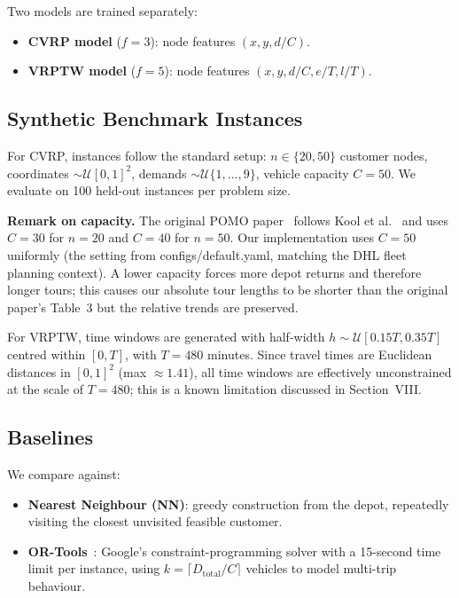 \documentclass[conference]{IEEEtran}
\begin{document}
Two models are trained separately:
\begin{itemize}
  \item \textbf{CVRP model} ($f=3$): node features $(x, y, d/C)$.
  \item \textbf{VRPTW model} ($f=5$): node features $(x, y, d/C, e/T, l/T)$.
\end{itemize}

\subsection{Synthetic Benchmark Instances}

For CVRP, instances follow the standard setup: $n \in \{20, 50\}$ customer
nodes, coordinates $\sim \mathcal{U}[0,1]^2$, demands $\sim
\mathcal{U}\{1,\ldots,9\}$, vehicle capacity $C=50$. We evaluate on 100
held-out instances per problem size.

\textbf{Remark on capacity.}
The original POMO paper~\cite{kwon2020pomo} follows Kool
et al.~\cite{kool2019attention} and uses $C=30$ for $n=20$ and $C=40$ for
$n=50$. Our implementation uses $C=50$ uniformly (the setting from
configs/default.yaml, matching the DHL fleet planning context). A lower
capacity forces more depot returns and therefore longer tours; this causes
our absolute tour lengths to be shorter than the original paper's Table~3
but the relative trends are preserved.

For VRPTW, time windows are generated with half-width $h \sim
\mathcal{U}[0.15T, 0.35T]$ centred within $[0, T]$, with $T=480$ minutes.
Since travel times are Euclidean distances in $[0,1]^2$ (max $\approx 1.41$),
all time windows are effectively unconstrained at the scale of $T=480$; this
is a known limitation discussed in Section~VIII.

\subsection{Baselines}

We compare against:
\begin{itemize}
  \item \textbf{Nearest Neighbour (NN)}: greedy construction from the depot,
    repeatedly visiting the closest unvisited feasible customer.
  \item \textbf{OR-Tools}~\cite{ortools}: Google's constraint-programming
    solver with a 15-second time limit per instance, using $k =
    \lceil D_\text{total}/C \rceil$ vehicles to model multi-trip behaviour.
\end{itemize}
\end{document}
